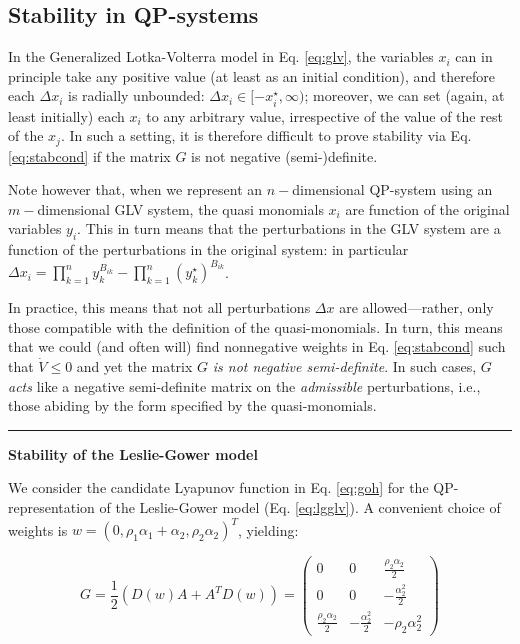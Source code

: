 \documentclass{article}
\begin{document}
\hypertarget{stability-in-qp-systems}{%
\subsection{Stability in QP-systems}\label{stability-in-qp-systems}}

In the Generalized Lotka-Volterra model in Eq. \ref{eq:glv}, the
variables \(x_i\) can in principle take any positive value (at least as
an initial condition), and therefore each \(\Delta x_i\) is radially
unbounded: \(\Delta x_i \in [-x_i^\star, \infty)\); moreover, we can set
(again, at least initially) each \(x_i\) to any arbitrary value,
irrespective of the value of the rest of the \(x_j\). In such a setting,
it is therefore difficult to prove stability via Eq. \ref{eq:stabcond}
if the matrix \(G\) is not negative (semi-)definite.

Note however that, when we represent an \(n-\)dimensional QP-system
using an \(m-\)dimensional GLV system, the quasi monomials \(x_i\) are
function of the original variables \(y_i\). This in turn means that the
perturbations in the GLV system are a function of the perturbations in
the original system: in particular
\(\Delta x_i = \prod_{k=1}^n y_k^{B_{ik}} - \prod_{k=1}^n (y_k^\star)^{B_{ik}}\).

In practice, this means that not all perturbations \(\Delta x\) are
allowed---rather, only those compatible with the definition of the
quasi-monomials. In turn, this means that we could (and often will) find
nonnegative weights in Eq. \ref{eq:stabcond} such that
\(\dot{V} \leq 0\) and yet the matrix \(G\) \emph{is not negative
semi-definite}. In such cases, \(G\) \emph{acts} like a negative
semi-definite matrix on the \emph{admissible} perturbations, i.e., those
abiding by the form specified by the quasi-monomials.

\begin{center}\rule{0.5\linewidth}{0.5pt}\end{center}

\textbf{Stability of the Leslie-Gower model}

We consider the candidate Lyapunov function in Eq. \ref{eq:goh} for the
QP-representation of the Leslie-Gower model (Eq. \ref{eq:lgglv}). A
convenient choice of weights is
\(w = (0, \rho_1 \alpha_1 + \alpha_2, \rho_2 \alpha_2 )^T\), yielding:

\begin{equation}
G =\frac{1}{2} (D(w)A + A^T D(w)) =
\begin{pmatrix}
0 & 0 & \frac{\rho_2 \alpha_2}{2} \\
0 & 0 & -\frac{\alpha_2^2}{2} \\
\frac{\rho_2 \alpha_2}{2} & -\frac{\alpha_2^2}{2} & -\rho_2 \alpha_2^2
\end{pmatrix}
\end{equation}
\end{document}
